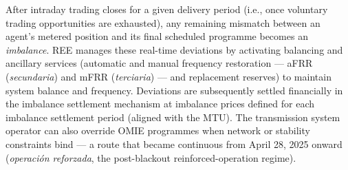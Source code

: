 \documentclass[11pt,a4paper]{article}
\begin{document}
After intraday trading closes for a given delivery period (i.e., once voluntary trading opportunities are exhausted), any remaining mismatch between an agent's metered position and its final scheduled programme becomes an \emph{imbalance}. REE manages these real-time deviations by activating balancing and ancillary services (automatic and manual frequency restoration --- aFRR (\emph{secundaria}) and mFRR (\emph{terciaria}) --- and replacement reserves) to maintain system balance and frequency. Deviations are subsequently settled financially in the imbalance settlement mechanism at imbalance prices defined for each imbalance settlement period (aligned with the MTU). The transmission system operator can also override OMIE programmes when network or stability constraints bind --- a route that became continuous from April 28, 2025 onward (\emph{operación reforzada}, the post-blackout reinforced-operation regime).
\end{document}
